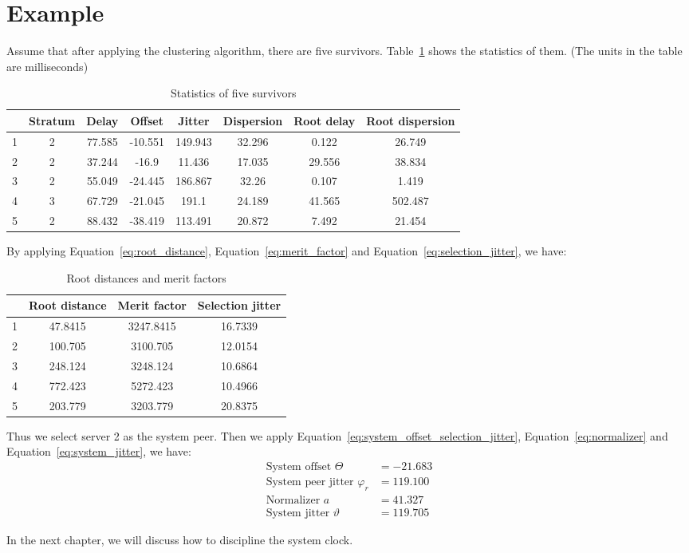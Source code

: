 \section{Example}%
\label{sec:example}

Assume that after applying the clustering algorithm, there are five survivors. 
Table~\ref{tab:sur} shows the statistics of them. (The units in the table are
milliseconds)

\begin{table}[htpb]
    \centering
    \caption{Statistics of five survivors}
    \label{tab:sur}
    \begin{tabular}{|c|c|c|c|c|c|c|c|}
        \hline
         & Stratum & Delay & Offset & Jitter & Dispersion & Root delay & Root
        dispersion \\
        \hline
        1 & 2 & 77.585 & -10.551 & 149.943 & 32.296 & 0.122  & 26.749  \\
        2 & 2 & 37.244 & -16.9   & 11.436  & 17.035 & 29.556 & 38.834  \\
        3 & 2 & 55.049 & -24.445 & 186.867 & 32.26  & 0.107  & 1.419   \\
        4 & 3 & 67.729 & -21.045 & 191.1   & 24.189 & 41.565 & 502.487 \\
        5 & 2 & 88.432 & -38.419 & 113.491 & 20.872 & 7.492  & 21.454  \\
        \hline
    \end{tabular}
\end{table}

By applying Equation~\ref{eq:root_distance}, Equation~\ref{eq:merit_factor}
and Equation~\ref{eq:selection_jitter},
we have:
\begin{table}[!h]
    \centering
    \caption{Root distances and merit factors}
    \label{tab:root_distance}
    \begin{tabular}{|c|c|c|c|}
        \hline
         & Root distance & Merit factor & Selection jitter \\
        \hline
         1 & 47.8415 & 3247.8415 & 16.7339 \\
         2 & 100.705 & 3100.705  & 12.0154 \\
         3 & 248.124 & 3248.124  & 10.6864 \\
         4 & 772.423 & 5272.423  & 10.4966 \\
         5 & 203.779 & 3203.779  & 20.8375 \\
        \hline
    \end{tabular}
\end{table}

Thus we select server 2 as the system peer. Then we apply
Equation~\ref{eq:system_offset_selection_jitter}, Equation~\ref{eq:normalizer}
and Equation~\ref{eq:system_jitter}, we have:
\begin{align*}
    \text{System offset } \Theta & = -21.683\\ 
    \text{System peer jitter } \varphi_r &= 119.100\\
    \text{Normalizer } a &= 41.327\\
    \text{System jitter } \vartheta & = 119.705
\end{align*}

In the next chapter, we will discuss how to discipline the system clock.
